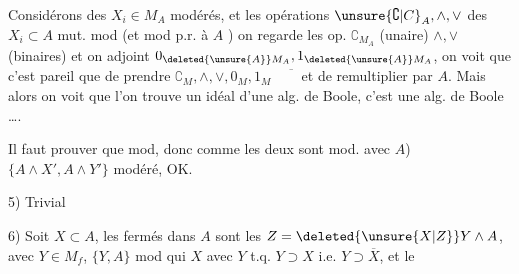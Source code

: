 Considérons des $X_i\in M_A$  modérés, et les opérations $\unsure{\complement|C}_A,\wedge,\vee$   des $X_i\subset A$ mut. mod (et mod p.r. à $A$ ) on regarde les op.
  $\complement_{M_A}$ (unaire) $\wedge,\vee$ (binaires) et on adjoint $0_{\deleted{\unsure{A}}M_A},1_{\deleted{\unsure{A}}M_A}$, on voit que c'est pareil que
 de prendre $\complement_M,\wedge,\vee,0_M,1_M\quad\overline{\phantom X}$ et de remultiplier par $A$. Mais
alors on voit que l'on trouve un idéal d'une alg. de Boole, c'est une alg. de Boole \ldots.

 Il faut prouver que
mod, donc comme  les deux  sont mod. avec $A$) $\{A\wedge X',A\wedge Y'\}$ modéré, OK.

5) Trivial

6) Soit $X\subset A$, les fermés dans $A$ sont les $Z=\deleted{\unsure{X|Z}}Y\wedge A$, avec $Y\in M_f$, $\{Y,A\}$ mod   qui  $X$   avec $Y$ t.q. $Y\supset X$ i.e. $Y\supset\overline X$, et le
